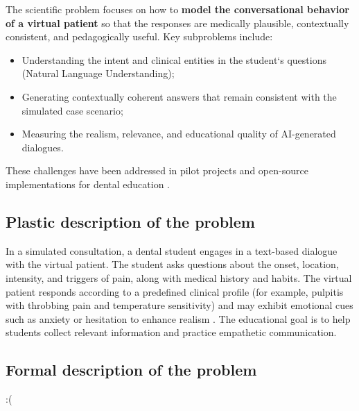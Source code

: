\documentclass[runningheads,a4paper,11pt]{report}
\begin{document}
The scientific problem focuses on how to \textbf{model the conversational behavior of a virtual patient} so that the responses are medically plausible, contextually consistent, and pedagogically useful. Key subproblems include:
\begin{itemize}
  \item Understanding the intent and clinical entities in the student`s questions (Natural Language Understanding);
  \item Generating contextually coherent answers that remain consistent with the simulated case scenario;
  \item Measuring the realism, relevance, and educational quality of AI-generated dialogues.
\end{itemize}
These challenges have been addressed in pilot projects and open-source implementations for dental education \cite{or2024, cepdnaclk2022}.

\subsection{Plastic description of the problem}

In a simulated consultation, a dental student engages in a text-based dialogue with the virtual patient. The student asks questions about the onset, location, intensity, and triggers of pain, along with medical history and habits. The virtual patient responds according to a predefined clinical profile (for example, pulpitis with throbbing pain and temperature sensitivity) and may exhibit emotional cues such as anxiety or hesitation to enhance realism \cite{suarez2022}. The educational goal is to help students collect relevant information and practice empathetic communication.

\subsection{Formal description of the problem}
:(
\end{document}

